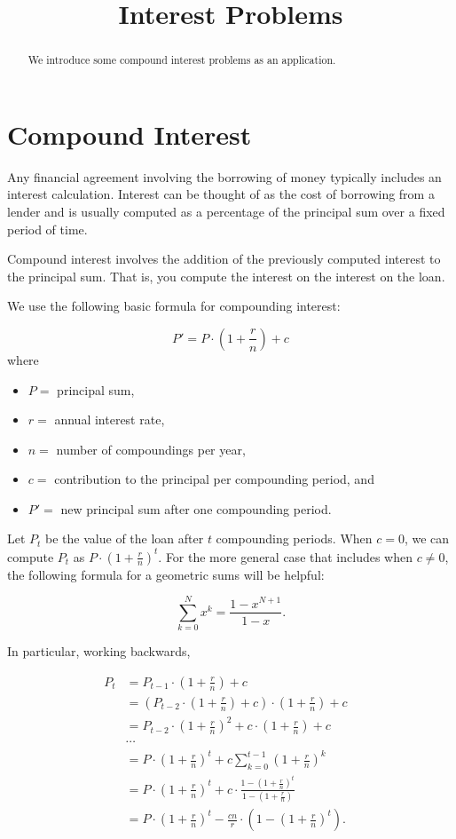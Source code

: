 \documentclass{ximera}
\title{Interest Problems}
\begin{document}
\begin{abstract}  
We introduce some compound interest problems as an application.
\end{abstract}  
\maketitle

\section{Compound Interest}

Any financial agreement involving the borrowing of money typically includes an interest calculation. Interest can be thought of as the cost of borrowing from a lender and is usually computed as a percentage of the principal sum over a fixed period of time.

Compound interest involves the addition of the previously computed interest to the principal sum. That is, you compute the interest on the interest on the loan.

We use the following basic formula for compounding interest:

$$P' = P\cdot\left(1+\frac{r}{n}\right) + c $$ where
\begin{itemize}
	\item $P = $ principal sum,
	\item $r = $ annual interest rate,
	\item $n = $ number of compoundings per year,
	\item $c = $ contribution to the principal per compounding period, and 
	\item $P' = $ new principal sum after one compounding period.
\end{itemize}

Let $P_t$ be the value of the loan after $t$ compounding periods. When $c=0$, we can compute $P_t$ as $P\cdot\left(1+\frac{r}{n}\right)^{t}$. For the more general case that includes when $c\neq 0$, the following formula for a geometric sums will be helpful:

$$\sum_{k=0}^Nx^k = \frac{1-x^{N+1}}{1-x}.$$

In particular, working backwards, 

\begin{align*}
	P_t & = P_{t-1}\cdot\left(1+\frac{r}{n}\right) + c\\
	    & = \left(P_{t-2}\cdot\left(1+\frac{r}{n}\right) + c\right)\cdot\left(1+\frac{r}{n}\right) + c\\
	    & = P_{t-2}\cdot\left(1+\frac{r}{n}\right)^2 + c\cdot\left(1+\frac{r}{n}\right) + c\\
	    & \cdots & \\
	    & = P\cdot\left(1+\frac{r}{n}\right)^t + c\sum_{k=0}^{t-1}\left(1+\frac{r}{n}\right)^k\\
	    & = P\cdot\left(1+\frac{r}{n}\right)^t + c\cdot\frac{1-\left(1+\frac{r}{n}\right)^t}{1-\left(1+\frac{r}{n}\right)}\\
	    & = P\cdot\left(1+\frac{r}{n}\right)^t - \frac{cn}{r}\cdot\left(1-\left(1+\frac{r}{n}\right)^t\right).
\end{align*}
\end{document}
